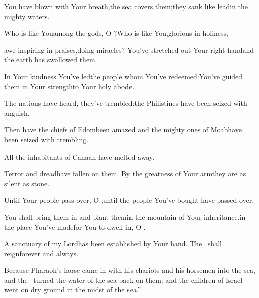\begin{inparaenum}
  \pa {} You have blown with Your breath,\pa the sea covers them;\pa they sank like lead\pa in the mighty waters.%
  
  \pa {} Who is like You\pa among the gods, O \lord?\pa Who is like You,\pa glorious in holiness,%
  
  \pb awe-inspiring in praises,\pa doing miracles?%
  \pa {} You've stretched out Your right hand\pa and the earth has swallowed them.%
  
  \pa {} In Your kindness You've led\pa the people whom You've redeemed:\pa You've guided them%
  in Your strength\pa to Your holy abode.%
  
  \pa {} The nations%
  have heard, they've trembled:\pa the Philistines have been seized with anguish.%
  
  \pa {} Then have the chiefs of Edom\pa been amazed%
  \pa and the mighty ones of Moab\pa have been seized with trembling.%
  
  \pb All the inhabitants of Canaan have melted away.%
  
  \pa {} Terror and dread\pa have fallen on them.%
  \pa By the greatness of Your arm\pa they are as silent as stone.%
  
  \pb Until Your people pass over, O \lord;\pa until the people You've bought have passed over.%
  
  \pa {} You shall bring them in and plant them\pa in the mountain of Your inheritance,\pa in the place You've made\pa for You to dwell in, O \lord.%
  
  \pb A sanctuary of my Lord\pa has been established by Your hand.\pa {} The \lord\ shall reign\pa forever and always.%
  
   Because Pharaoh's horse came in with his chariots and his horsemen into the sea, and the \lord\ turned the water of the sea back on them; and the children of Israel went on dry ground in the midst of the sea.''%
  

\end{inparaenum}
